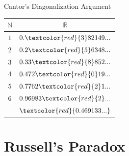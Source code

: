 \documentclass[utf8]{beamer}
\begin{document}
\begin{frame}{Cantor's Diagonalization Argument}
\begin{center}
\begin{tabular}{| c | c |}
\hline
$\mathbb{N}$ & $\mathbb{R}$ \\
\hline
$1$ & $0.\textcolor{red}{3}82149...$ \\
\hline
$2$ & $0.2\textcolor{red}{5}6348...$ \\
\hline
$3$ & $0.33\textcolor{red}{8}852...$ \\
\hline
$4$ & $0.472\textcolor{red}{0}19...$ \\
\hline
$5$ & $0.7762\textcolor{red}{2}1...$ \\
\hline
$6$ & $0.96983\textcolor{red}{2}...$ \\
\hline
& $\textcolor{red}{0.469133...}$ \\
\hline
\end{tabular}
\end{center}
\end{frame}

\part{Russell's Paradox}
\begin{frame}
\partpage
\end{frame}
\end{document}
